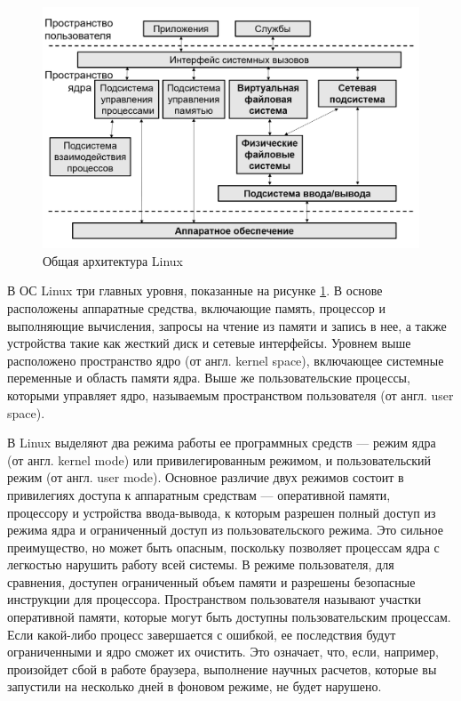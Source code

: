 \begin{figure}[h!]
	\centering
	\includegraphics[height=0.4\textheight]{img/arch_linux} %
	\caption{Общая архитектура Linux}
	\label{img:arch_linux}
\end{figure}

В ОС Linux три главных уровня, показанные на рисунке \ref{img:arch_linux}.
В основе расположены аппаратные средства, включающие память, процессор и выполняющие вычисления, запросы на чтение из памяти и запись в нее, а также устройства такие как жесткий диск и сетевые интерфейсы.
Уровнем выше расположено пространство ядро (от англ. kernel space), включающее системные переменные и область памяти ядра. Выше же пользовательские процессы, которыми управляет ядро, называемым пространством пользователя (от англ. user space).

В Linux выделяют два режима работы ее программных средств --- режим ядра (от англ. kernel mode) или привилегированным режимом, и пользовательский режим (от англ. user mode).
Основное различие двух режимов состоит в привилегиях доступа к аппаратным средствам --- оперативной памяти, процессору и устройства ввода-вывода, к которым разрешен полный доступ из режима ядра и ограниченный доступ из пользовательского режима. Это сильное преимущество, но может быть опасным, поскольку позволяет процессам ядра с легкостью нарушить работу всей системы.
В режиме пользователя, для сравнения, доступен ограниченный объем памяти и разрешены безопасные инструкции для процессора.
Пространством пользователя называют участки оперативной памяти, которые могут быть доступны пользовательским процессам. Если какой-либо процесс завершается с ошибкой, ее последствия будут ограниченными и ядро сможет их очистить. Это означает, что, если, например, произойдет сбой в работе браузера, выполнение научных расчетов, которые вы запустили на несколько дней в фоновом режиме, не будет нарушено.

